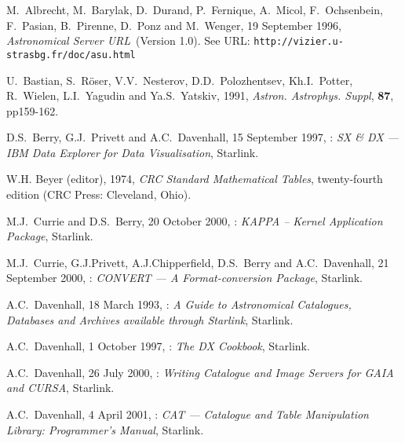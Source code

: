 \documentclass[twoside,11pt]{starlink}
\begin{document}


% 
\newpage
{}
\begin{thebibliography}{99}

   M.~Albrecht, M.~Barylak, D.~Durand, P.~Fernique,
   A.~Micol, F.~Ochsenbein, F.~Pasian, B.~Pirenne, D.~Ponz and
   M.~Wenger, 19 September 1996, \textit{Astronomical Server URL}\,
   (Version 1.0).  See URL: \texttt{http://vizier.u-strasbg.fr/doc/asu.html}

   U.~Bastian, S.~R\"{o}ser, V.V.~Nesterov, D.D.~Polozhentsev,
   Kh.I.~Potter, R.~Wielen, L.I.~Yagudin and Ya.S.~Yatskiv, 1991,
   \textit{Astron. Astrophys. Suppl}, \textbf{87}, pp159-162.

   D.S.~Berry, G.J.~Privett and A.C.~Davenhall,
   15 September 1997, : \textit{SX \& DX ---
   IBM Data Explorer for Data Visualisation}, Starlink.

   W.H. Beyer (editor), 1974, \textit{CRC Standard
   Mathematical Tables}, twenty-fourth edition (CRC Press: Cleveland,
   Ohio).

   M.J.~Currie and D.S.~Berry, 20 October 2000,
   : \textit{KAPPA -- Kernel Application Package},
   Starlink.

   M.J.~Currie, G.J.Privett, A.J.Chipperfield, D.S.~Berry
   and A.C.~Davenhall, 21 September 2000, : \textit{CONVERT --- A Format-conversion Package}, Starlink.

   A.C.~Davenhall, 18 March 1993, :
   \textit{A Guide to Astronomical Catalogues, Databases and Archives available
   through Starlink}, Starlink.

   A.C.~Davenhall, 1 October 1997, :
   \textit{The DX Cookbook}, Starlink.

   A.C.~Davenhall, 26 July 2000,
   : \textit{Writing Catalogue and Image Servers for
   GAIA and CURSA}, Starlink.

   A.C.~Davenhall, 4 April 2001,
   : \textit{CAT --- Catalogue and Table Manipulation
   Library: Programmer's Manual}, Starlink.


\end{thebibliography}
\end{document}
